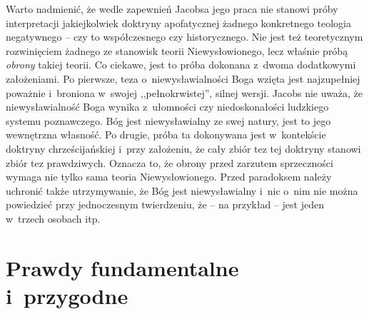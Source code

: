 Warto nadmienić, że wedle zapewnień Jacobsa jego praca nie stanowi próby interpretacji jakiejkolwiek doktryny apofatycznej żadnego konkretnego teologia negatywnego -- czy to współczesnego czy historycznego. Nie jest też teoretycznym rozwinięciem żadnego ze stanowisk teorii Niewysłowionego, lecz właśnie próbą \textit{obrony} takiej teorii. Co ciekawe, jest to próba dokonana z~dwoma dodatkowymi założeniami. Po pierwsze, teza o~niewysławialności Boga wzięta jest najzupełniej poważnie i~broniona w~swojej ,,pełnokrwistej'', silnej wersji. Jacobs nie uważa, że niewysławialność Boga wynika z~ułomności czy niedoskonałości ludzkiego systemu poznawczego. Bóg jest niewysławialny ze swej natury, jest to jego wewnętrzna własność. Po drugie, próba ta dokonywana jest w~kontekście doktryny chrześcijańskiej i~przy założeniu, że cały zbiór tez tej doktryny stanowi zbiór tez prawdziwych. Oznacza to, że obrony przed zarzutem sprzeczności wymaga nie tylko sama teoria Niewysłowionego. Przed paradoksem należy uchronić także utrzymywanie, że Bóg jest niewysławialny i~nic o~nim nie można powiedzieć przy jednoczesnym twierdzeniu, że -- na przykład -- jest jeden w~trzech osobach itp.


\section{Prawdy fundamentalne i~przygodne}

